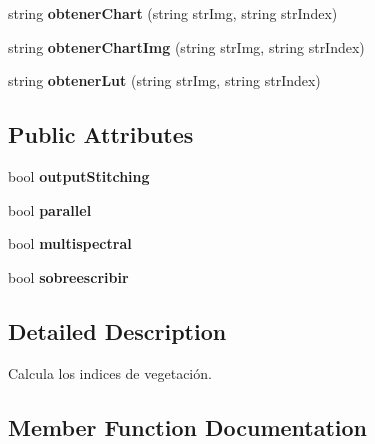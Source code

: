 \begin{DoxyCompactItemize}
\item 
\mbox{\label{classIndexCalculation_a41d32a9c7c279ae5192d38f4863fe0e4}} 
string {\bfseries obtener\+Chart} (string str\+Img, string str\+Index)
\item 
\mbox{\label{classIndexCalculation_a52874b7110859a2ce475ea058ac68bfd}} 
string {\bfseries obtener\+Chart\+Img} (string str\+Img, string str\+Index)
\item 
\mbox{\label{classIndexCalculation_a33f09c3755a9e6a83261c1fd71a9e20d}} 
string {\bfseries obtener\+Lut} (string str\+Img, string str\+Index)
\end{DoxyCompactItemize}
\subsection*{Public Attributes}
\begin{DoxyCompactItemize}
\item 
\mbox{\label{classIndexCalculation_a2a1ce2e6437e6bd929cf6f975876e4ca}} 
bool {\bfseries output\+Stitching}
\item 
\mbox{\label{classIndexCalculation_a6b0355c3158fd94f6e0d9fa6d06f4634}} 
bool {\bfseries parallel}
\item 
\mbox{\label{classIndexCalculation_ab8b7a39b981cacd16e8bbbe1e680cc7a}} 
bool {\bfseries multispectral}
\item 
\mbox{\label{classIndexCalculation_a830090130362271d6732a770f99e23ce}} 
bool {\bfseries sobreescribir}
\end{DoxyCompactItemize}


\subsection{Detailed Description}
Calcula los indices de vegetación. 

\subsection{Member Function Documentation}
\mbox{\label{classIndexCalculation_acb0a9e1ded8f0d9550e7dad18e66058c}} 

